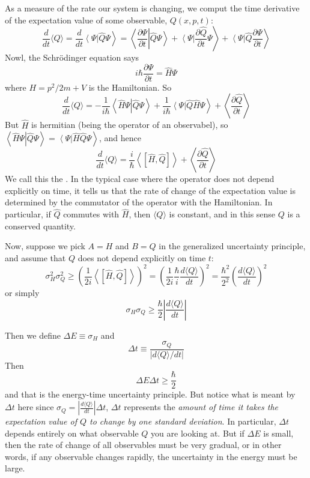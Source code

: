 \documentclass[12pt, a4paper, oneside, openright, titlepage]{book}
\newcommand{\braket}[2]{\left\langle#1\right\vert\left.#2\right\rangle}
\begin{document}
As a measure of the rate our system is changing, we comput the time derivative of the expectation value of some observable, $Q(x,p,t)$: $$\frac{d}{dt}\langle Q\rangle = \frac{d}{dt}\braket{\Psi}{\hat{Q}\Psi} = \braket{\frac{\partial \Psi}{\partial t}}{\hat{Q}\Psi} + \braket{\Psi}{\frac{\partial \hat{Q}}{\partial t}\Psi} + \braket{\Psi}{\hat{Q}\frac{\partial \Psi}{\partial t}}$$  
Nowl, the Schr\"{o}dinger equation says $$i\hbar\frac{\partial\Psi}{\partial t} = \hat{H}\Psi$$
where $H = p^2/2m + V$ is the Hamiltonian. So $$\frac{d}{dt}\langle Q\rangle = -\frac{1}{i\hbar}\braket{\hat{H}\Psi}{\hat{Q}\Psi} + \frac{1}{i\hbar}\braket{\Psi}{\hat{Q}\hat{H}\Psi} + \left\langle \frac{\partial\hat{Q}}{\partial t}\right\rangle$$
But $\hat{H}$ is hermitian (being the operator of an observabel), so $\braket{\hat{H}\Psi}{\hat{Q}\Psi} = \braket{\Psi}{\hat{H}\hat{Q}\Psi}$, and hence \begin{equation*}
    \boxed{\frac{d}{dt}\langle Q\rangle = \frac{i}{\hbar}\left\langle\left[\hat{H},\hat{Q}\right]\right\rangle + \left\langle \frac{\partial\hat{Q}}{\partial t}\right\rangle}
\end{equation*}
We call this the . In the typical case where the operator does not depend explicitly on time, it tells us that the rate of change of the expectation value is determined by the commutator of the operator with the Hamiltonian. In particular, if $\hat{Q}$ commutes with $\hat{H}$, then $\langle Q\rangle$ is constant, and in this sense $Q$ is a conserved quantity.

Now, suppose we pick $A = H$ and $B = Q$ in the generalized uncertainty principle, and assume that $Q$ does not depend explicitly on time $t$: $$\sigma_H^2\sigma_Q^2 \geq \left(\frac{1}{2i}\left\langle \left[\hat{H},\hat{Q}\right]\right\rangle\right)^2 = \left(\frac{1}{2i}\frac{\hbar}{i}\frac{d\langle Q\rangle}{dt}\right)^2 = \frac{\hbar^2}{2^2}\left(\frac{d\langle Q\rangle}{dt}\right)^2$$ or simply $$\sigma_H\sigma_Q \geq \frac{\hbar}{2}\left|\frac{d\langle Q\rangle}{dt}\right|$$

Then we define $\Delta E \equiv \sigma_H$ and $$\Delta t \equiv \frac{\sigma_Q}{|d\langle Q\rangle/dt|}$$
Then $$\Delta E\Delta t \geq \frac{\hbar}{2}$$
and that is the energy-time uncertainty principle. But notice what is meant by $\Delta t$ here since $\sigma_Q = \left|\frac{d\langle Q\rangle}{dt}\right|\Delta t$, $\Delta t$ represents the \emph{amount of time it takes the expectation value of $Q$ to change by one standard deviation}. In particular, $\Delta t$ depends entirely on what observable $Q$ you are looking at. But if $\Delta E$ is small, then the rate of change of all observables must be very gradual, or in other words, if any observable changes rapidly, the uncertainty in the energy must be large.
\end{document}
